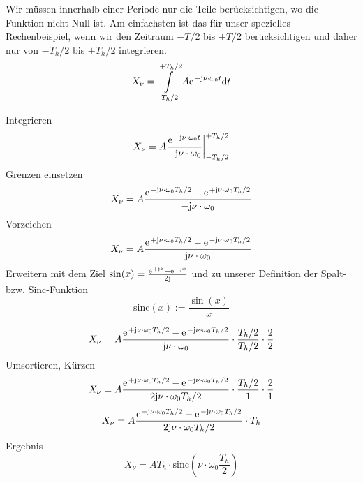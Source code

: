 \begin{Ansatz}
%
Wir müssen innerhalb einer Periode nur die Teile berücksichtigen, wo
die Funktion nicht Null ist. Am einfachsten ist das für unser spezielles Rechenbeispiel,
wenn wir den Zeitraum $-T/2$ bis $+T/2$ berücksichtigen und
daher nur von $-T_h/2$ bis $+T_h/2$ integrieren.
\begin{equation}
X_\nu =  \int\limits_{-T_h/2}^{+T_h/2} A \e^{-\im \nu \cdot \omega_0 t} \mathrm{d}t
\end{equation}
%
\end{Ansatz}
%
\begin{ExCalc}
Integrieren
\begin{equation}
X_\nu = A \frac{\e^{-\im \nu \cdot \omega_0 t}}{-\im \nu \cdot \omega_0 }\bigg|_{-T_h/2}^{+T_h/2}
\end{equation}
Grenzen einsetzen
\begin{equation}
X_\nu = A \frac{\e^{-\im \nu \cdot \omega_0 T_h/2} - \e^{+\im \nu \cdot \omega_0 T_h/2}}{-\im \nu \cdot \omega_0 }
\end{equation}
Vorzeichen
\begin{equation}
X_\nu = A \frac{\e^{+\im \nu \cdot \omega_0 T_h/2}-\e^{-\im \nu \cdot \omega_0 T_h/2}}{\im \nu \cdot \omega_0 }
\end{equation}
Erweitern mit dem Ziel $\sin(x) = \frac{\e^{+\im x}-\e^{-\im x}}{2\im}$ und zu unserer Definition der Spalt- bzw. Sinc-Funktion
$$\mathrm{sinc}(x):=\frac{\sin(x)}{x}$$

\begin{equation}
X_\nu = A \frac{\e^{+\im \nu \cdot \omega_0 T_h/2}-\e^{-\im \nu \cdot \omega_0 T_h/2}}{\im \nu \cdot \omega_0 } \cdot \frac{T_h/2}{T_h/2} \cdot \frac{2}{2}
\end{equation}
Umsortieren, Kürzen
\begin{equation}
X_\nu = A \frac{\e^{+\im \nu \cdot \omega_0 T_h/2}-\e^{-\im \nu \cdot \omega_0 T_h/2}}{2\im \nu \cdot \omega_0 T_h/2} \cdot \frac{T_h/2}{1} \cdot \frac{2}{1}
\end{equation}
%
\begin{equation}
X_\nu = A \frac{\e^{+\im \nu \cdot \omega_0 T_h/2}-\e^{-\im \nu \cdot \omega_0 T_h/2}}{2\im \nu \cdot \omega_0 T_h/2} \cdot T_h
\end{equation}
%
Ergebnis
\begin{equation}
X_\nu = A T_h \cdot \mathrm{sinc}(\nu \cdot \omega_0 \frac{T_h}{2})
\end{equation}
\end{ExCalc}

